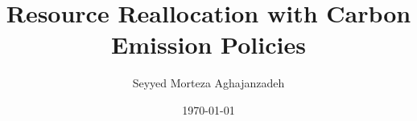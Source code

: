 \title{Resource Reallocation with Carbon Emission Policies}
\author{Seyyed Morteza Aghajanzadeh}
\date{\today}